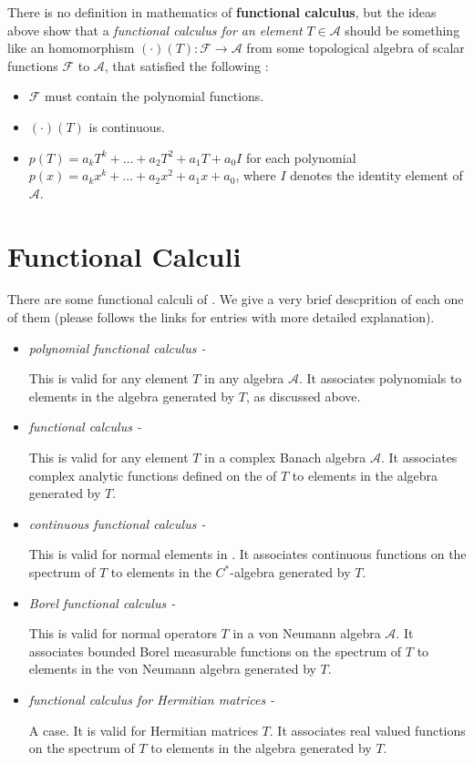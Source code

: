 \documentclass[12pt]{article}
\begin{document}
There is no definition in mathematics of {\bf functional calculus}, but the ideas above show that a \emph{functional calculus for an element} $T \in \mathcal{A}$ should be something like an homomorphism $(\cdot)(T) : \mathcal{F} \longrightarrow \mathcal{A}$ from some topological algebra of scalar functions $\mathcal{F}$ to $\mathcal{A}$, that satisfied the following :

\begin{itemize}
\item $\mathcal{F}$ must contain the polynomial functions.
\item $(\cdot)(T)$ is continuous.
\item $p(T)= a_kT^k + \dots + a_2T^2 + a_1T +a_0I$ for each polynomial $p(x)=a_kx^k + \dots + a_2x^2 + a_1x + a_0$, where $I$ denotes the identity element of $\mathcal{A}$.
\end{itemize}

\section{Functional Calculi}

There are some functional calculi of . We give a very brief descprition of each one of them (please follows the links for entries with more detailed explanation).

\begin{itemize}
\item \emph{polynomial functional calculus - }

This is valid for any element $T$ in any algebra $\mathcal{A}$. It associates polynomials to elements in the algebra generated by $T$, as discussed above.

\item \emph{ functional calculus - }

This is valid for any element $T$ in a complex Banach algebra $\mathcal{A}$. It associates complex analytic functions defined on the  of $T$ to elements in the algebra generated by $T$.

\item \emph{continuous functional calculus - }

This is valid for normal elements in . It associates continuous functions on the spectrum of $T$ to elements in the $C^*$-algebra generated by $T$.

\item \emph{Borel functional calculus - }

This is valid for normal operators $T$ in a von Neumann algebra $\mathcal{A}$. It associates bounded Borel measurable functions on the spectrum of $T$ to elements in the von Neumann algebra generated by $T$.

\item \emph{functional calculus for Hermitian matrices - }

A  case. It is valid for Hermitian matrices $T$. It associates real valued functions on the spectrum of $T$ to elements in the algebra generated by $T$.
\end{itemize}
\end{document}
